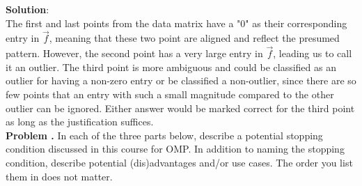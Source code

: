 \documentclass[11pt,letterpaper]{article}
\newcounter{problem}
\newcommand{\problem}{
	\stepcounter{problem}%
	\noindent \textbf{Problem \theproblem. }%
}
\begin{document}
\textbf{Solution}: \\
The first and last points from the data matrix have a "0" as their corresponding entry in $\vec{f}$, meaning that these two point are aligned and reflect the presumed pattern. However, the second point has a very large entry in $\vec{f}$, leading us to call it an outlier. The third point is more ambiguous and could be classified as an outlier for having a non-zero entry or be classified a non-outlier, since there are so few points that an entry with such a small magnitude compared to the other outlier can be ignored. Either answer would be marked correct for the third point as long as the justification suffices. \\

\problem In each of the three parts below, describe a potential stopping condition discussed in this course for OMP. In addition to naming the stopping condition, describe potential (dis)advantages and/or use cases. The order you list them in does not matter.
\end{document}
